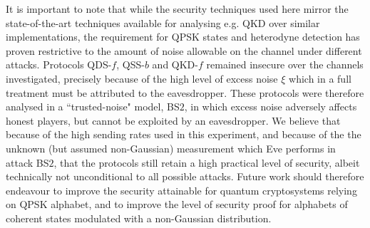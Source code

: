 It is important to note that while the security techniques used here mirror the state-of-the-art techniques available for analysing e.g. QKD \cite{Papanastasiou2018} over similar implementations, the requirement for QPSK states and heterodyne detection has proven restrictive to the amount of noise allowable on the channel under different attacks. Protocols QDS-$f$, QSS-$b$ and QKD-$f$ remained insecure over the channels investigated, precisely because of the high level of excess noise $\xi$ which in a full treatment must be attributed to the eavesdropper. These protocols were therefore analysed in a ``trusted-noise" model, BS$2$, in which excess noise adversely affects honest players, but cannot be exploited by an eavesdropper. We believe that because of the high sending rates used in this experiment, and because of the the unknown (but assumed non-Gaussian) measurement which Eve performs in attack BS$2$, that the protocols still retain a high practical level of security, albeit technically not unconditional to all possible attacks. Future work should therefore endeavour to improve the security attainable for quantum cryptosystems relying on QPSK alphabet, and to improve the level of security proof for alphabets of coherent states modulated with a non-Gaussian distribution.

